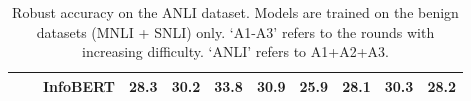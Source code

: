 \documentclass{article} \usepackage{iclr2021_conference,times}
\theoremstyle{definition}
\theoremstyle{remark}
\begin{document}
\begin{table}[t]
{\begin{tabular}{c|c|l|cccc|cccc}
                                                  &                                       & InfoBERT   & 28.3 & 30.2 & 33.8 & \textbf{30.9} & 25.9 & 28.1 & 30.3 & \textbf{28.2} \\                          
\bottomrule
\end{tabular}
}
\caption{Robust accuracy on the ANLI dataset. Models are trained on the benign datasets (MNLI + SNLI) only. `A1-A3' refers to the rounds with increasing difficulty. `ANLI' refers to A1+A2+A3.} 
\label{tab:set1_acc}
\vspace{-2mm}
\end{table} \begin{table}[t]
\centering
{}
\end{table}
\end{document}
